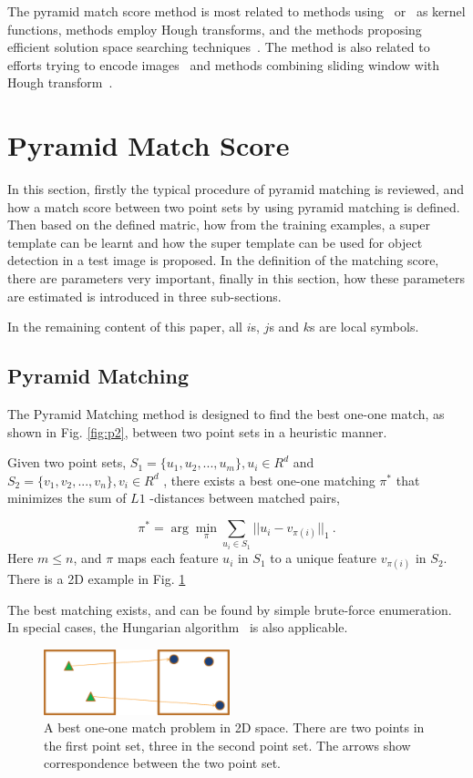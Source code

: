 \documentclass[paper]{ieice}
\begin{document}
The pyramid match score method is most related to methods using~\cite{pmk} or~\cite{kmts} as kernel functions, methods employ Hough transforms, and the methods proposing efficient solution space searching techniques~\cite{bab}. The method is also related to efforts trying to encode images~\cite{spen} and methods combining sliding window with Hough transform~\cite{ac18}.



\section{Pyramid Match Score}

\label{dt5}
In this section, firstly the typical procedure of pyramid matching is reviewed, and how a match score between two point sets by using pyramid matching is defined. Then based on the defined matric, how from the training examples, a super template can be learnt and how the super template can be used for object detection in a test image is proposed. In the definition of the matching score, there are parameters very important, finally in this section, how these parameters are estimated is introduced in three sub-sections.

In the remaining content of this paper, all $i$s, $j$s and $k$s are local symbols.
\subsection{Pyramid Matching}



The Pyramid Matching method is designed to find the best one-one match, as shown in Fig. \ref{fig:p2}, between two point sets in a heuristic manner.

Given two point sets, ${S_1} = \{ {u_1},{u_2},...,{u_m}\}, u_i \in {R^d}
$
 and ${S_2} = \{ {v_1},{v_2},...,{v_n}\}, v_i \in {R^d}$
, there exists a best one-one matching ${\pi}^*$ that minimizes the sum of $L1$
-distances between matched pairs,

\[
{\pi ^*} = \arg \mathop {\min }\limits_\pi  \sum\limits_{{u_i} \in {S_1}} {||{u_i} - {v_{\pi (i)}}|{|_1}} \ .
\]
Here $m  \le n$, and $\pi$ maps each feature $u_i$ in $S_1$ to a unique feature ${{v_{\pi (i)}}}
$ in $S_2$. There is a 2D example in Fig. \ref{fig:pms1}

The best matching exists, and can be found by simple brute-force enumeration. In special cases, the Hungarian algorithm~\cite{ha} is also applicable.

\begin{figure}
\centering
\includegraphics[width=0.48\textwidth]{pms1.eps}
\caption[Best one-one match]{A best one-one match problem in 2D space. There are two points in the first point set, three in the second point set. The arrows show correspondence between the two point set.}
\label{fig:pms1}
\end{figure}
\end{document}
